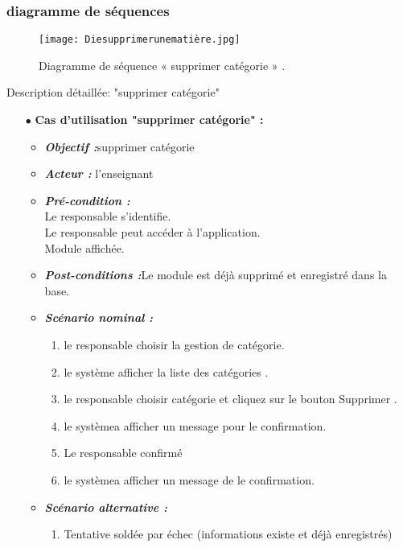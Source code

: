 \subsubsection{diagramme de séquences }
\begin{figure}[ht]
	\centering
	\texttt{[image: Diesupprimerunematière.jpg]}
	\caption{ Diagramme de séquence « supprimer catégorie » .}
	\label{fig: Diagramme de séquence  supprimer catégorie   }
\end{figure}
\FloatBarrier

\clearpage

{\Large \color{cyan} Description détaillée: "supprimer catégorie"}
\begin{itemize}
	\item[$\bullet$] \textbf{Cas d’utilisation "supprimer catégorie" :} 
	\medskip
	\begin{itemize}
		\item \textit{\textbf{Objectif :}}supprimer catégorie	
		\item \textit{\textbf{Acteur :}}  l'enseignant
		\item \textit{\textbf{Pré-condition  :}} \\
		Le responsable s’identifie.\\
		Le responsable peut accéder à l’application.\\
		Module affichée.
		\item \textit{\textbf{Post-conditions   :}}Le module est déjà supprimé et enregistré dans la
		base.
		\item \textit{\textbf{Scénario nominal :}}
		\begin{enumerate}
			\item le responsable choisir la gestion de catégorie.
			\item le système afficher la liste des catégories .
			\item le responsable choisir catégorie et cliquez sur le bouton Supprimer .
			
			\item le systèmea afficher un message pour le confirmation. 
			\item  Le responsable confirmé
			\item le systèmea afficher un message de le confirmation.
		\end{enumerate}
		\item \textit{\textbf{Scénario alternative :}}
		\begin{enumerate}
			\item Tentative soldée par échec (informations existe et
			déjà enregistrés)
		\end{enumerate}
	\end{itemize}
\end{itemize}	
\bigskip

